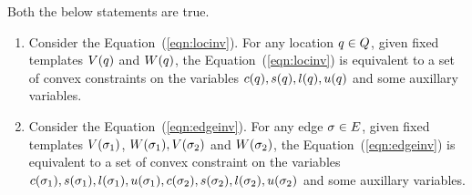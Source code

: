 \begin{proposition}
Both the below statements are true.
\begin{enumerate}
\item Consider the Equation~(\ref{eqn:locinv}).  For any location
$q\in Q$, given fixed templates $V(q)$ and $W(q)$,
the Equation~(\ref{eqn:locinv}) is equivalent to a set of convex
constraints on the variables $c(q),s(q),l(q),u(q)$ and
some auxillary variables.
\item Consider the Equation~(\ref{eqn:edgeinv}).  For any edge
$\sigma\in E$, given fixed templates
$V(\sigma_{1})$, $W(\sigma_{1}),V(\sigma_{2})$ and
$W(\sigma_{2})$, the Equation~(\ref{eqn:edgeinv}) is equivalent
to a set of convex constraint on the variables
$c(\sigma_{1}),s(\sigma_{1}),l(\sigma_{1}),u(\sigma_{1}),
c(\sigma_{2}),s(\sigma_{2}),l(\sigma_{2}),u(\sigma_{2})$
and some auxillary variables.
\end{enumerate}
\end{proposition}
%
